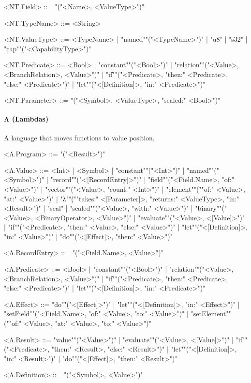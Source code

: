 \documentclass[main.tex]{subfiles}
\begin{document}
\begin{grammar}
				<NT.Field> ::=
							"("<Name>, <ValueType>")"
				\par
				<NT.TypeName> ::=
						<String>
				\par
				<NT.ValueType> ::=
								<TypeName> |
						"named""("<TypeName>")"
						| "u8"
						| "s32"
						| "cap""("<CapabilityType>")"
				\par
				<NT.Predicate> ::=
						<Bool> |
						"constant""("<Bool>")"
						| "relation""("<Value>, <BranchRelation>, <Value>")"
						| "if""("<Predicate>, "then:" <Predicate>, "else:" <Predicate>")"
						| "let""("<[Definition]>, "in:" <Predicate>")"
				\par
				<NT.Parameter> ::=
							"("<Symbol>, <ValueType>, "sealed:" <Bool>")"
				\par
\end{grammar}
\par
\paragraph{ Λ (Lambdas) } A language that moves functions to value position.
\begin{grammar}
	\footnotesize
				<Λ.Program> ::=
							"("<Result>")"
				\par
				<Λ.Value> ::=
						<Int> |
								<Symbol> |
						"constant""("<Int>")"
						| "named""("<Symbol>")"
						| "record""("<[RecordEntry]>")"
						| "field""("<Field.Name>, "of:" <Value>")"
						| "vector""("<Value>, "count:" <Int>")"
						| "element""(""of:" <Value>, "at:" <Value>")"
						| "λ""(""takes:" <[Parameter]>, "returns:" <ValueType>, "in:" <Result>")"
						| "seal"
						| "sealed""("<Value>, "with:" <Value>")"
						| "binary""("<Value>, <BinaryOperator>, <Value>")"
						| "evaluate""("<Value>, <[Value]>")"
						| "if""("<Predicate>, "then:" <Value>, "else:" <Value>")"
						| "let""("<[Definition]>, "in:" <Value>")"
						| "do""("<[Effect]>, "then:" <Value>")"
				\par
				<Λ.RecordEntry> ::=
							"("<Field.Name>, <Value>")"
				\par
				<Λ.Predicate> ::=
						<Bool> |
						"constant""("<Bool>")"
						| "relation""("<Value>, <BranchRelation>, <Value>")"
						| "if""("<Predicate>, "then:" <Predicate>, "else:" <Predicate>")"
						| "let""("<[Definition]>, "in:" <Predicate>")"
				\par
				<Λ.Effect> ::=
						"do""("<[Effect]>")"
						| "let""("<[Definition]>, "in:" <Effect>")"
						| "setField""("<Field.Name>, "of:" <Value>, "to:" <Value>")"
						| "setElement""(""of:" <Value>, "at:" <Value>, "to:" <Value>")"
				\par
				<Λ.Result> ::=
						"value""("<Value>")"
						| "evaluate""("<Value>, <[Value]>")"
						| "if""("<Predicate>, "then:" <Result>, "else:" <Result>")"
						| "let""("<[Definition]>, "in:" <Result>")"
						| "do""("<[Effect]>, "then:" <Result>")"
				\par
				<Λ.Definition> ::=
							"("<Symbol>, <Value>")"
				\par
\end{grammar}
\par
\end{document}
